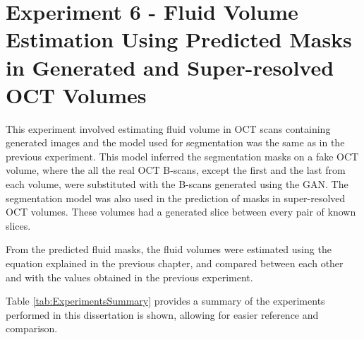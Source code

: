 \section{Experiment 6 - Fluid Volume Estimation Using Predicted Masks in Generated and Super-resolved OCT Volumes}

This experiment involved estimating fluid volume in OCT scans containing generated images and the model used for segmentation was the same as in the previous experiment. This model inferred the segmentation masks on a fake OCT volume, where the all the real OCT B-scans, except the first and the last from each volume, were substituted with the B-scans generated using the GAN. The segmentation model was also used in the prediction of masks in super-resolved OCT volumes. These volumes had a generated slice between every pair of known slices.
\par
From the predicted fluid masks, the fluid volumes were estimated using the equation explained in the previous chapter, and compared between each other and with the values obtained in the previous experiment.
\par
Table \ref{tab:ExperimentsSummary} provides a summary of the experiments performed in this dissertation is shown, allowing for easier reference and comparison.

